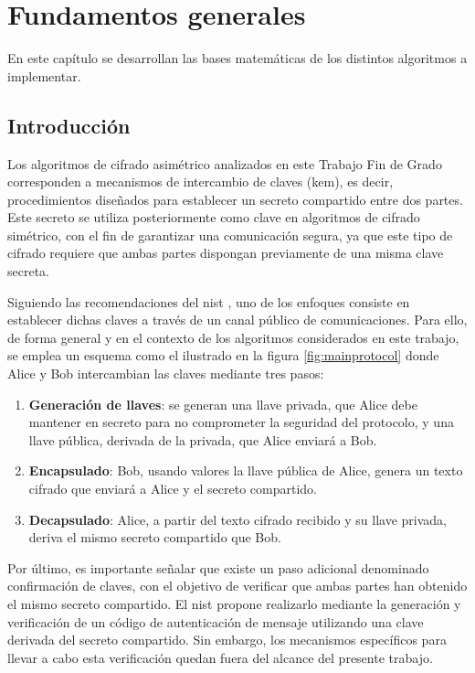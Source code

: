 \chapter{Fundamentos generales}
En este capítulo se desarrollan las bases matemáticas de los distintos algoritmos a implementar.
\section{Introducción}
Los algoritmos de cifrado asimétrico analizados en este Trabajo Fin de Grado corresponden a mecanismos de intercambio de claves (\acrshort{kem}), es decir, procedimientos diseñados para establecer un secreto compartido entre dos partes. Este secreto se utiliza posteriormente como clave en algoritmos de cifrado simétrico, con el fin de garantizar una comunicación segura, ya que este tipo de cifrado requiere que ambas partes dispongan previamente de una misma clave secreta.
\newline

Siguiendo las recomendaciones del \acrshort{nist} \cite{NIST_SP_800_227_ipd_2025}, uno de los enfoques consiste en establecer dichas claves a través de un canal público de comunicaciones. Para ello, de forma general y en el contexto de los algoritmos considerados en este trabajo, se emplea un esquema como el ilustrado en la figura \ref{fig:mainprotocol} donde Alice y Bob intercambian las claves mediante tres pasos:
\begin{enumerate}
	\item \textbf{Generación de llaves}: se generan una llave privada, que Alice debe mantener en secreto para no comprometer la seguridad del protocolo, y una llave pública, derivada de la privada, que Alice enviará a Bob.
	\item \textbf{Encapsulado}: Bob, usando valores la llave pública de Alice, genera un texto cifrado que enviará a Alice y el secreto compartido.
	\item \textbf{Decapsulado}: Alice, a partir del texto cifrado recibido y su llave privada, deriva el mismo secreto compartido que Bob.
\end{enumerate}


Por último, es importante señalar que existe un paso adicional denominado confirmación de claves, con el objetivo de verificar que ambas partes han obtenido el mismo secreto compartido. El \acrshort{nist} propone realizarlo mediante la generación y verificación de un código de autenticación de mensaje utilizando una clave derivada del secreto compartido. Sin embargo, los mecanismos específicos para llevar a cabo esta verificación quedan fuera del alcance del presente trabajo.
\newpage

